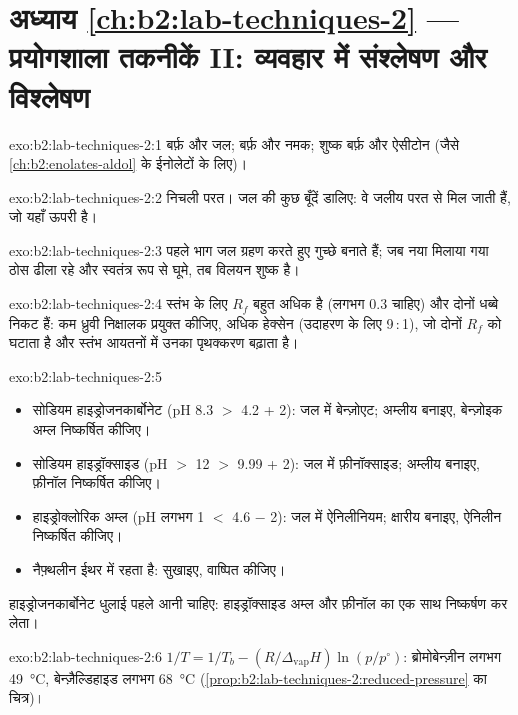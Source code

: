 \section*{अध्याय \ref{ch:b2:lab-techniques-2} --- प्रयोगशाला तकनीकें II: व्यवहार में संश्लेषण और विश्लेषण}

\begin{solution}{exo:b2:lab-techniques-2:1}
बर्फ़ और जल; बर्फ़ और नमक; शुष्क बर्फ़ और ऐसीटोन (जैसे \cref{ch:b2:enolates-aldol} के ईनोलेटों के लिए)।
\end{solution}

\begin{solution}{exo:b2:lab-techniques-2:2}
निचली परत। जल की कुछ बूँदें डालिए: वे जलीय परत से मिल जाती हैं, जो यहाँ ऊपरी है।
\end{solution}

\begin{solution}{exo:b2:lab-techniques-2:3}
पहले भाग जल ग्रहण करते हुए गुच्छे बनाते हैं; जब नया मिलाया गया ठोस ढीला रहे और स्वतंत्र रूप से घूमे,
तब विलयन शुष्क है।
\end{solution}

\begin{solution}{exo:b2:lab-techniques-2:4}
स्तंभ के लिए $R_f$ बहुत अधिक है (लगभग 0.3 चाहिए) और दोनों धब्बे निकट हैं: कम ध्रुवी
निक्षालक प्रयुक्त कीजिए, अधिक हेक्सेन (उदाहरण के लिए 9\,:\,1), जो दोनों $R_f$ को घटाता है और स्तंभ आयतनों में
उनका पृथक्करण बढ़ाता है।
\end{solution}

\begin{solution}{exo:b2:lab-techniques-2:5}
\begin{itemize}
  \item सोडियम हाइड्रोजनकार्बोनेट (pH 8.3 $>$ 4.2 + 2): जल में बेन्ज़ोएट; अम्लीय बनाइए, बेन्ज़ोइक अम्ल निष्कर्षित कीजिए।
  \item सोडियम हाइड्रॉक्साइड (pH $>$ 12 $>$ 9.99 + 2): जल में फ़ीनॉक्साइड; अम्लीय बनाइए, फ़ीनॉल निष्कर्षित कीजिए।
  \item हाइड्रोक्लोरिक अम्ल (pH लगभग 1 $<$ 4.6 $-$ 2): जल में ऐनिलीनियम; क्षारीय बनाइए, ऐनिलीन निष्कर्षित कीजिए।
  \item नैफ़्थलीन ईथर में रहता है: सुखाइए, वाष्पित कीजिए।
\end{itemize}
हाइड्रोजनकार्बोनेट धुलाई पहले आनी चाहिए: हाइड्रॉक्साइड अम्ल और फ़ीनॉल का एक साथ निष्कर्षण कर लेता।
\end{solution}

\begin{solution}{exo:b2:lab-techniques-2:6}
$1/T = 1/T_b - (R/\Delta_{\mathrm{vap}}H)\ln(p/p^\circ)$: ब्रोमोबेन्ज़ीन लगभग \qty{49}{\degreeCelsius},
बेन्ज़ैल्डिहाइड लगभग \qty{68}{\degreeCelsius} (\cref{prop:b2:lab-techniques-2:reduced-pressure} का चित्र)।
\end{solution}

